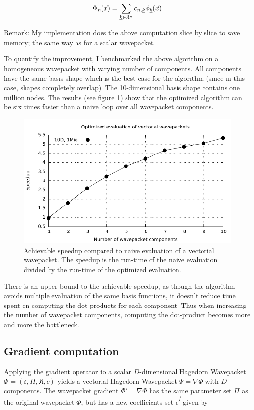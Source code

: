 \documentclass{article}
\begin{document}
\[
\Phi_n(\vec{x})=\sum_{\underline{k} \in \mathfrak{K}^n} c_{n,\underline{k}} \phi_{\underline{k}}(\vec{x})
\]

Remark: My implementation does the above computation slice by slice to save memory;
the same way as for a scalar wavepacket.

To quantify the improvement, I benchmarked the above algorithm on a homogeneous wavepacket with
varying number of components. All components have the same basis shape which is
the best case for the algorithm (since in this case, shapes completely overlap).
The 10-dimensional basis shape contains one million nodes.
The results (see figure \ref{fig:hawp_homogen_evaluation_speedup}) show that the
optimized algorithm can be six times faster than a naive loop over all
wavepacket components.

\begin{figure}[H]
  \centering
  \includegraphics[width=1.0\textwidth]{plots/hawp_eval_homogen_speedup}
  \caption{
    Achievable speedup compared to naive evaluation of a vectorial wavepacket.
    The speedup is the run-time of the naive evaluation divided by the run-time of
    the optimized evaluation.
  }
  \label{fig:hawp_homogen_evaluation_speedup}
\end{figure}

There is an upper bound to the achievable speedup, as though the algorithm
avoids multiple evaluation of the same basis functions, it doesn't reduce
time spent on computing the dot products for each component.
Thus when increasing the number of wavepacket components, computing the dot-product becomes
more and more the bottleneck.

\subsection{Gradient computation}
Applying the gradient operator to a scalar \(D\)-dimensional Hagedorn Wave\-packet
\( \Phi = \left( \varepsilon, \Pi, \mathfrak{K}, c \right)\)
yields a vectorial Hagedorn Wavepacket \(\Psi=\nabla\Phi\) with \(D\) components.
The wavepacket gradient \(\Phi' = \nabla \Phi\) has the same parameter set \(\Pi\)
as the original wavepacket \(\Phi\), but has a new coefficients set \(\vec{c'}\) given by
\end{document}
